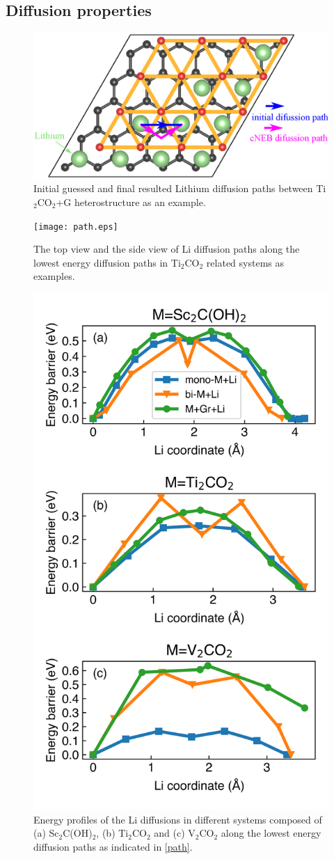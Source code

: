 \subsection{Diffusion properties}

\begin{figure}[htbp]
\centering
\includegraphics[width=0.8\linewidth]{sites_path.eps}%
\caption{Initial guessed and final resulted Lithium diffusion paths between Ti$_2$CO$_2$+G heterostructure as an example. }
\end{figure}

\begin{figure}[htbp]
\centering
\texttt{[image: path.eps]}%
\caption{The top view and the side view of Li diffusion paths along the lowest energy diffusion paths in Ti$_2$CO$_2$ related systems as examples. \label{path}}
\end{figure}

\begin{figure}[htbp]
\centering
\includegraphics[width=0.7\linewidth]{Li_barrier.png}%
\caption{Energy profiles of the Li diffusions in different systems composed of (a) Sc$_2$C(OH)$_2$, (b) Ti$_2$CO$_2$ and (c) V$_2$CO$_2$ along the lowest energy diffusion paths as indicated in \autoref{path}. \label{barrier}}
\end{figure}

